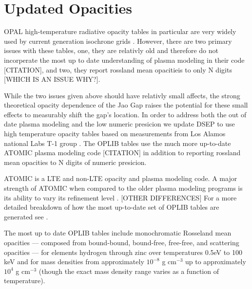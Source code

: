 \section{Updated Opacities}\label{sec:opac}
OPAL high-temperature radiative opacity tables in particular are very widely
used by current generation isochrone grids \citep[e.g. Dartmouth, MIST, \&
StarEvol, ][]{Dotter2008,Choi2016,Amard2019}. However, there are two primary
issues with these tables, one, they are relativly old and therefore do not
incorperate the most up to date understanding of plasma modeling in their code
{\color{red} [CITATION]}, and two, they report rossland mean opacitieis to only
{\color{red} N} digits {\color{red} [WHICH IS AN ISSUE WHY?]}.

While the two issues given above should have relativly small affects, the
strong theoretical opacity dependence of the Jao Gap raises the potential for
these small effects to measurably shift the gap's location. In order to address
both the out of date plasma modeling and the low numeric presicion we update
DSEP to use high temperature opacity tables based on measurements from Los
Alamos national Labs T-1 group \citep[OPLIB,][]{Colgan2016}. The OPLIB tables
use the much more up-to-date ATOMIC plasma modeling code {\color{red}
[CITATION]} in addition to reporting rossland mean opacities to {\color{red} N}
digits of numeric presicion.

ATOMIC \citep{Magee2004} is a LTE and non-LTE opacity and plasma modeling code.
A major strength of ATOMIC when compared to the older plasma modeling programs
is its ability to vary its refinement level \citep{Fontes2016}.
{\color{red}[OTHER DIFFERENCES]} For a more detailed breakdown of how the most
up-to-date set of OPLIB tables are generated see \citep{Colgan2016}.

The most up to date OPLIB tables include monochromatic Rosseland mean opacities
--- composed from bound-bound, bound-free, free-free, and scattering opacities
--- for elements hydrogen through zinc over temperatures 0.5eV to 100 keV and
for mass densities from approximately $10^{-8}$ g cm$^{-3}$ up to approximately
$10^{4}$ g cm$^{-3}$ (though the exact mass density range varies as a function
of temperature). 

